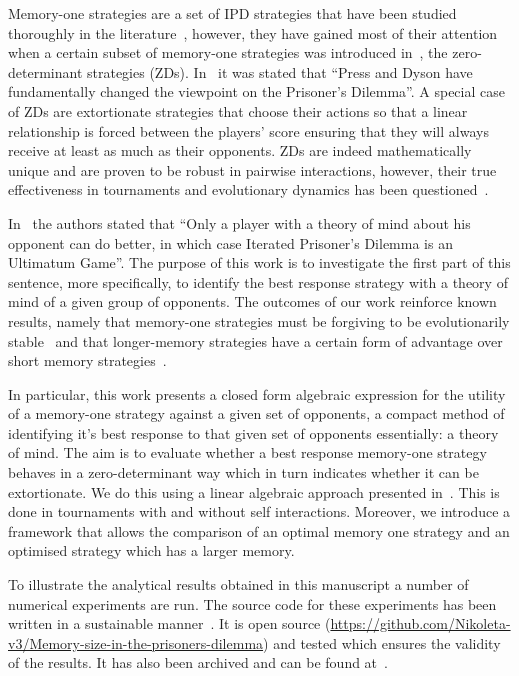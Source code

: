 \documentclass[10pt]{article}
\begin{document}
Memory-one strategies are a set of IPD strategies that have been
studied thoroughly in the literature~\cite{Nowak1990, Nowak1993}, however, they have gained
most of their attention when a certain subset of memory-one strategies was
introduced in~\cite{Press2012}, the zero-determinant strategies (ZDs). In~\cite{Stewart2012} it
was stated that ``Press and Dyson have fundamentally changed the viewpoint on
the Prisoner's Dilemma''.
A special case of ZDs are extortionate strategies that choose their actions so that a linear relationship is forced
between the players' score ensuring that they will always
receive at least as much as their opponents. ZDs are
indeed mathematically unique and are proven to be robust in pairwise
interactions, however, their true effectiveness in tournaments and
evolutionary dynamics has been questioned~\cite{adami2013, Hilbe2013b,
Hilbe2013, Hilbe2015, Knight2018, Harper2015}.

In~\cite{Press2012} the authors stated that ``Only a player with a theory of
mind about his opponent can do better, in which case Iterated Prisoner's Dilemma
is an Ultimatum Game''. The purpose of this work is to investigate the first
part of this sentence, more specifically, to identify the best response strategy
with a theory of mind of a given group of opponents. The outcomes of our work
reinforce known results, namely that memory-one strategies must be forgiving to
be evolutionarily stable~\cite{Stewart2013, Stewart2016} and that longer-memory
strategies have a certain form of advantage over short memory
strategies~\cite{Hilbe2017, Pan2015}.

In particular, this work presents a closed form algebraic expression for the utility
of a memory-one strategy against a given set of opponents, a compact method of
identifying it's best response to that given set of opponents essentially: a theory
of mind. The aim is
to evaluate whether a best response memory-one strategy behaves in a
zero-determinant way which in turn indicates whether it can be extortionate. We
do this using a linear algebraic approach presented in~\cite{Knight2019}.
This is done in tournaments with and without self interactions. Moreover, we
introduce a framework that allows the comparison of an optimal
memory one strategy and an optimised strategy which has a larger memory.

To illustrate the analytical results obtained in this manuscript a number of
numerical experiments are run. The source code for these experiments has been
written in a sustainable manner~\cite{Benureau2018}.
It is open source (\url{https://github.com/Nikoleta-v3/Memory-size-in-the-prisoners-dilemma})
and tested which ensures the validity of the results. It has also been archived
and can be found at~\cite{nikoleta_glynatsi_2019}.
\end{document}
